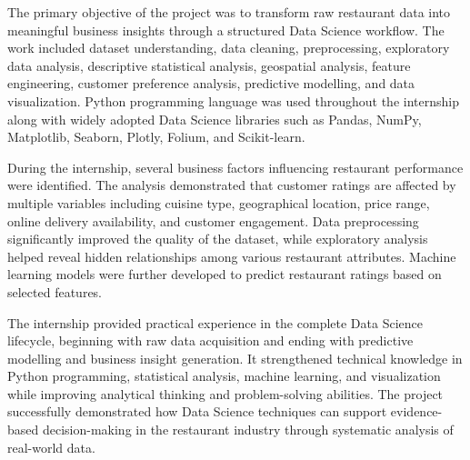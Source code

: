 \documentclass[12pt,a4paper]{report}
\begin{document}
The primary objective of the project was to transform raw restaurant data into meaningful business insights through a structured Data Science workflow. The work included dataset understanding, data cleaning, preprocessing, exploratory data analysis, descriptive statistical analysis, geospatial analysis, feature engineering, customer preference analysis, predictive modelling, and data visualization. Python programming language was used throughout the internship along with widely adopted Data Science libraries such as Pandas, NumPy, Matplotlib, Seaborn, Plotly, Folium, and Scikit-learn.

During the internship, several business factors influencing restaurant performance were identified. The analysis demonstrated that customer ratings are affected by multiple variables including cuisine type, geographical location, price range, online delivery availability, and customer engagement. Data preprocessing significantly improved the quality of the dataset, while exploratory analysis helped reveal hidden relationships among various restaurant attributes. Machine learning models were further developed to predict restaurant ratings based on selected features.

The internship provided practical experience in the complete Data Science lifecycle, beginning with raw data acquisition and ending with predictive modelling and business insight generation. It strengthened technical knowledge in Python programming, statistical analysis, machine learning, and visualization while improving analytical thinking and problem-solving abilities. The project successfully demonstrated how Data Science techniques can support evidence-based decision-making in the restaurant industry through systematic analysis of real-world data.

\newpage


\tableofcontents

\newpage


\listoffigures

\newpage

\end{document}
